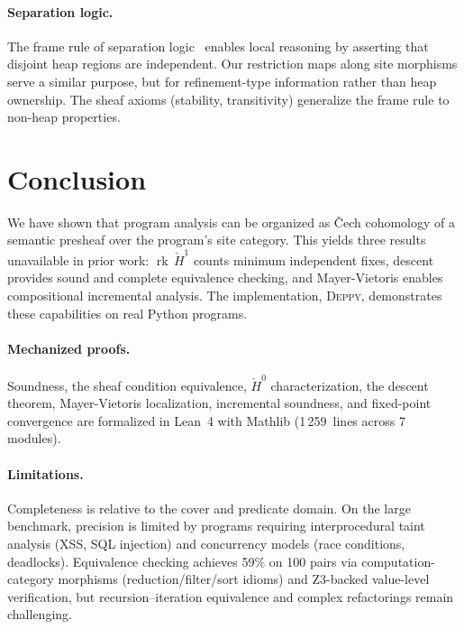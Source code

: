 \documentclass[acmsmall,screen,review,anonymous]{acmart}
\theoremstyle{remark}
\newcommand{\Hc}[1]{\check{H}^{#1}}
\newcommand{\rk}{\operatorname{rk}}
\begin{document}
\paragraph{Separation logic.}
The frame rule of separation logic~\cite{OHearnReynoldsYang01}
enables local reasoning by asserting that disjoint heap regions are
independent.  Our restriction maps along site morphisms serve a
similar purpose, but for refinement-type information rather than heap
ownership.  The sheaf axioms (stability, transitivity) generalize the
frame rule to non-heap properties.

\section{Conclusion}\label{sec:conclusion}

We have shown that program analysis can be organized as \v{C}ech
cohomology of a semantic presheaf over the program's site category.
This yields three results unavailable in prior work:
$\rk\,\Hc{1}$ counts minimum independent fixes, descent provides
sound and complete equivalence checking, and Mayer-Vietoris enables
compositional incremental analysis.  The implementation,
\textsc{Deppy}, demonstrates these capabilities on real Python
programs.

\paragraph{Mechanized proofs.}
Soundness, the sheaf condition equivalence, $\Hc{0}$ characterization,
the descent theorem, Mayer-Vietoris localization, incremental
soundness, and fixed-point convergence are formalized in Lean~4
with Mathlib (1\,259~lines across 7 modules).

\paragraph{Limitations.}
Completeness is relative to the cover and predicate domain.
On the large benchmark, precision is limited by programs
requiring interprocedural taint analysis (XSS, SQL injection)
and concurrency models (race conditions, deadlocks).
Equivalence checking achieves 59\% on 100 pairs via
computation-category morphisms (reduction/filter/sort idioms)
and Z3-backed value-level verification, but
recursion--iteration equivalence and complex refactorings
remain challenging.
\end{document}
